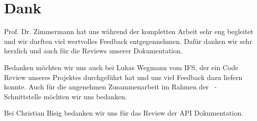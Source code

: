 \section{Dank}

	Prof. Dr. Zimmermann hat uns während der kompletten Arbeit sehr eng begleitet und wir durften viel wertvolles Feedback entgegennehmen.
	Dafür danken wir sehr herzlich und auch für die Reviews unserer Dokumentation.
	
	Bedanken möchten wir uns auch bei Lukas Wegmann vom IFS,
	der ein Code Review unseres Projektes durchgeführt hat und uns viel Feedback dazu liefern konnte.
	Auch für die angenehmen Zusammenarbeit im Rahmen der \dks\ -Schnittstelle möchten wir uns bedanken.
	
	Bei Christian Bisig bedanken wir uns für das Review der API Dokumentation.
	
	